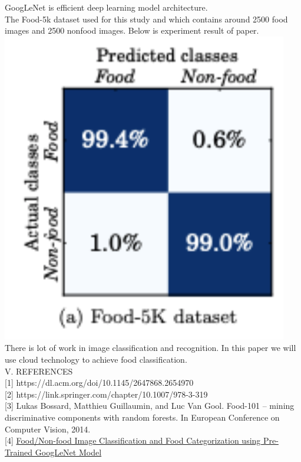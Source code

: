 \documentclass{IEEEtran}
\begin{document}
GoogLeNet is efficient deep learning model architecture.\\

The Food-5k dataset used for this study and which contains around 2500 food images and 2500 nonfood images. Below is experiment result of paper.\\

\includegraphics[scale=0.5]{classes}\\

There is lot of work in image classification and recognition. In this paper we will use cloud technology to achieve food classification.\\


V. REFERENCES\\

[1] https://dl.acm.org/doi/10.1145/2647868.2654970\\

[2] https://link.springer.com/chapter/10.1007/978-3-319\\

[3] Lukas Bossard, Matthieu Guillaumin, and Luc Van Gool. Food-101 – mining discriminative components with random forests. In European Conference on Computer Vision, 2014.\\

[4] \href{https://www.researchgate.net/publication/310823982_FoodN on-
food_Image_Classification_and_Food_Categorization_using _Pre-Trained_GoogLeNet_Model}{Food/Non-food Image Classification and Food Categorization using Pre-Trained GoogLeNet Model
}\\
\end{document}
